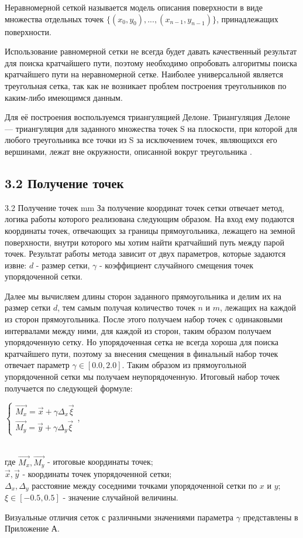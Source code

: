 \par
Неравномерной сеткой называется модель описания поверхности в виде множества отдельных точек $\{(x_0, y_0), ..., (x_{n-1}, y_{n-1})\}$, принадлежащих поверхности.
\par
Использование равномерной сетки не всегда будет давать качественный результат для поиска кратчайшего пути, поэтому необходимо опробовать алгоритмы поиска кратчайшего пути на неравномерной сетке. Наиболее универсальной является треугольная сетка, так как не возникает проблем построения треугольников по каким-либо имеющимся данным.
\par
Для её построения воспользуемся триангуляцией Делоне.
Триангуляция Делоне --- триангуляция для заданного множества точек S на плоскости, при которой для любого треугольника все точки из S за исключением точек, являющихся его вершинами, лежат вне окружности, описанной вокруг треугольника \cite{Delaunay}. 

\subsection*{\Large{3.2 Получение точек }}
 {3.2 Получение точек}
 mm
За получение координат точек сетки отвечает метод, логика работы которого реализована следующим образом. На вход ему подаются координаты точек, отвечающих за границы прямоугольника, лежащего на земной поверхности, внутри которого мы хотим найти кратчайший путь между парой точек. Результат работы метода зависит от двух параметров, которые задаются извне:
$d$ - размер сетки, $\gamma$ - коэффициент случайного смещения точек упорядоченной сетки.
\par
Далее мы вычисляем длины сторон заданного прямоугольника и делим их на размер сетки $d$, тем самым получая количество точек $n$ и $m$, лежащих на каждой из сторон прямоугольника. После этого получаем набор точек с одинаковыми интервалами между ними, для каждой из сторон, таким образом получаем упорядоченную сетку. Но упорядоченная сетка не всегда хороша для поиска кратчайшего пути, поэтому за внесения смещения в финальный набор точек отвечает параметр $\gamma \in [0.0,2.0]$. Таким образом из прямоугольной упорядоченной сетки мы получаем неупорядоченную. Итоговый набор точек получается по следующей формуле:\\
\centerline{ $\left\{\begin{matrix}
	\overrightarrow{M_x} = \overrightarrow{x} + \gamma \Delta_x \overrightarrow{\xi} \\ 
	\overrightarrow{M_y} = \overrightarrow{y} + \gamma \Delta_y \overrightarrow{\xi}
	\end{matrix}\right.$,} \\
где $\overrightarrow{M_x}, \overrightarrow{M_y}$ - итоговые координаты точек;\\
$\overrightarrow{x}, \overrightarrow{y}$ - координаты точек упорядоченной сетки;\\
$\Delta_x, \Delta_y$ расстояние между соседними точками упорядоченной сетки по $x$ и $y$;\\
$\xi \in [-0.5, 0.5]$ - значение случайной величины.
\par
Визуальные отличия сеток с различными значениями параметра $\gamma$ представлены в Приложение А.

